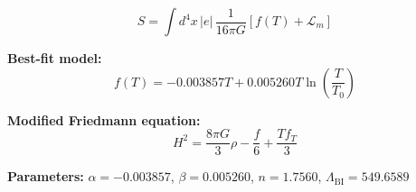 
\begin{equation}
  S = \int d^4x \, |e| \, \frac{1}{16\pi G} \left[ f(T) + \mathcal{L}_m \right]
\end{equation}

\textbf{Best-fit model:}
\begin{equation}
  f(T) = -0.003857 T + 0.005260 T \ln\!\left(\frac{T}{T_0}\right)
\end{equation}

\textbf{Modified Friedmann equation:}
\begin{equation}
  H^2 = \frac{8\pi G}{3} \rho - \frac{f}{6} + \frac{T f_T}{3}
\end{equation}

\textbf{Parameters:}
$\alpha = -0.003857$, \quad
$\beta = 0.005260$, \quad
$n = 1.7560$, \quad
$\Lambda_{\text{BI}} = 549.6589$